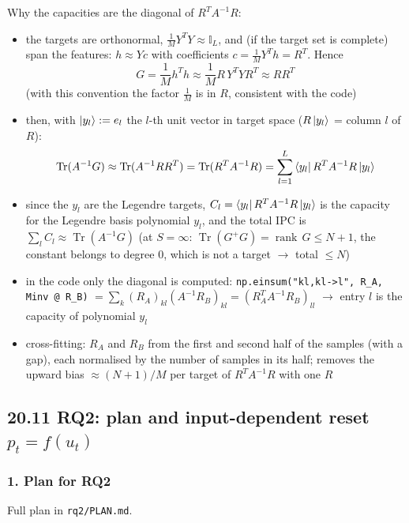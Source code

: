 Why the capacities are the diagonal of $R^T A^{-1} R$:
\begin{itemize}
    \item the targets are orthonormal, $\frac{1}{M} Y^T Y \approx \mathbb{I}_L$, and (if the target set is
    complete) span the features: $h \approx Y c$ with coefficients $c = \frac{1}{M} Y^T h = R^T$. Hence
    \begin{equation*}
        G = \frac{1}{M} h^T h \approx \frac{1}{M} R\, Y^T Y R^T \approx R R^T
    \end{equation*}
    (with this convention the factor $\frac{1}{M}$ is in $R$, consistent with the code)
    \item then, with $\ket{y_l} := e_l$ the $l$-th unit vector in target space ($R\ket{y_l}$ = column $l$ of $R$):
    \begin{equation*}
        \operatorname{Tr}(A^{-1} G) \approx \operatorname{Tr}(A^{-1} R R^T) = \operatorname{Tr}(R^T A^{-1} R)
        = \sum_{l=1}^{L} \bra{y_l} R^T A^{-1} R \ket{y_l}
    \end{equation*}
    \item since the $y_l$ are the Legendre targets, $C_l = \bra{y_l} R^T A^{-1} R \ket{y_l}$ is the capacity
    for the Legendre basis polynomial $y_l$, and the total IPC is $\sum_l C_l \approx \operatorname{Tr}(A^{-1}G)$
    (at $S = \infty$: $\operatorname{Tr}(G^+ G) = \operatorname{rank}\, G \le N + 1$, the constant belongs
    to degree 0, which is not a target $\to$ total $\le N$)
    \item in the code only the diagonal is computed:
    \texttt{np.einsum("kl,kl->l", R\_A, Minv @ R\_B)} $= \sum_k (R_A)_{kl} (A^{-1} R_B)_{kl}
    = (R_A^T A^{-1} R_B)_{ll}$ $\to$ entry $l$ is the capacity of polynomial $y_l$
    \item cross-fitting: $R_A$ and $R_B$ from the first and second half of the samples (with a gap), each
    normalised by the number of samples in its half; removes the upward bias $\approx (N+1)/M$ per target
    of $R^T A^{-1} R$ with one $R$
\end{itemize}

\subsection*{20.11 \quad RQ2: plan and input-dependent reset $p_t = f(u_t)$}

\subsubsection*{1. Plan for RQ2}
\label{sec:rq2-plan}
Full plan in \texttt{rq2/PLAN.md}.

